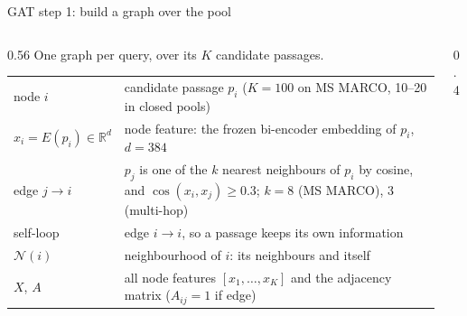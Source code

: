 \documentclass[aspectratio=169,11pt]{beamer}
\makeatletter
\newcommand{\gloss}[1]{\begingroup\footnotesize\renewcommand{\arraystretch}{1.18}\begin{tabular}{@{}>{\color{ctx}}l@{\hspace{0.6em}}>{\raggedright\arraybackslash}p{#1}@{}}}
\newcommand{\glossend}{\end{tabular}\endgroup}
\makeatother
\begin{document}
\begin{frame}{GAT step 1: build a graph over the pool}
\begin{columns}[T]
\begin{column}{0.56\textwidth}
One graph per query, over its $K$ candidate passages.\\[0.25cm]
\gloss{6.2cm}
node $i$ & candidate passage $p_i$ ($K=100$ on MS MARCO, 10--20 in closed pools)\\
$x_i=E(p_i)\in\mathbb R^{d}$ & node feature: the frozen bi-encoder embedding of $p_i$, $d=384$\\
edge $j\to i$ & $p_j$ is one of the $k$ nearest neighbours of $p_i$ by cosine, and $\cos(x_i,x_j)\ge0.3$; $k=8$ (MS MARCO), 3 (multi-hop)\\
self-loop & edge $i\to i$, so a passage keeps its own information\\
$\mathcal N(i)$ & neighbourhood of $i$: its neighbours and itself\\
$X$, $A$ & all node features $[x_1,\dots,x_K]$ and the adjacency matrix ($A_{ij}=1$ if edge)\\
\glossend
\end{column}
\begin{column}{0.4\textwidth}
\centering
{}
\end{column}
\end{columns}
\end{frame}
\end{document}
